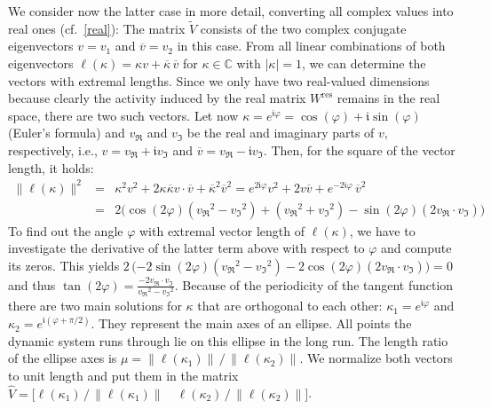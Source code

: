 \documentclass[twoside,11pt]{article}
\theoremstyle{definition}
\begin{document}
We consider now the latter case in more detail, converting all complex values
into real ones (cf.~\cref{real}): The matrix $\tilde{V}$ consists of the two
complex conjugate eigenvectors $v = v_1$ and $\overline{v} = v_2$ in this case.
From all linear combinations of both eigenvectors $\ell(\kappa)
= \kappa v + \overline{\kappa}\,\overline{v}$ for $\kappa \in \mathbb{C}$ with $|\kappa| =
1$, we can determine the vectors with extremal lengths. Since we only have two
real-valued dimensions because clearly the activity induced by the real
matrix $W^\mathrm{res}$ remains in the real space, there are two such vectors.
Let now $\kappa = e^{\mathfrak{i} \varphi} = \cos(\varphi) + \mathfrak{i}
\sin(\varphi)$ (Euler's formula) and $v_\Re$ and $v_\Im$ be the real and
imaginary parts of $v$, respectively, i.e., $v = v_\Re+\mathfrak{i} v_\Im$ and
$\overline{v} = v_\Re-\mathfrak{i} v_\Im$. Then, for the square of the vector
length, it holds:
\begin{eqnarray*}
\|\ell(\kappa)\|^2
& = & \kappa^2 v^2 + 2 \kappa \overline{\kappa} v\!\cdot\!\overline{v} + \overline{\kappa}^2 \overline{v}^2
= e^{2 \mathfrak{i} \varphi} v^2 + 2 v \overline{v} + e^{-2 \mathfrak{i} \varphi}\,\overline{v}^2\\[3pt]
& = & 2 \big(\!\cos(2\varphi) ({v_\Re}^2\!-\!{v_\Im}^2) + ({v_\Re}^2\!+\!{v_\Im}^2) - \sin(2\varphi) (2 v_\Re\!\cdot\!v_\Im) \big)
\end{eqnarray*}
To find out the angle $\varphi$ with extremal vector length of $\ell(\kappa)$,
we have to investigate the derivative of the latter term above with respect to
$\varphi$ and compute its zeros. This yields $2\,\big(\mathrm{-}2 \sin(2\varphi)
({v_\Re}^2\!-\!{v_\Im}^2) - 2\cos(2\varphi) (2 v_\Re\!\cdot\!v_\Im) \big) = 0$
and thus $\tan(2\varphi) = \frac{-2 v_\Re \cdot v_\Im}{{v_\Re}^2-{v_\Im}^2}$.
Because of the periodicity of the tangent function there are two main solutions
for $\kappa$ that are orthogonal to each other: $\kappa_1 = e^{\mathfrak{i}\varphi}$ and
$\kappa_2 = e^{\mathfrak{i}(\varphi+\pi/2)}$. They represent the main axes of an ellipse.
All points the dynamic system runs through lie on this ellipse in the long run.
The length ratio of the ellipse axes is $\mu = \|\ell(\kappa_1)\| \,/\,
\|\ell(\kappa_2)\|$. We normalize both vectors to unit length and put them in
the matrix $\hat{V} = \big[ \ell(\kappa_1) \,/\, \|\ell(\kappa_1)\| \quad
\ell(\kappa_2) \,/\, \|\ell(\kappa_2)\| \big]$.
\end{document}
